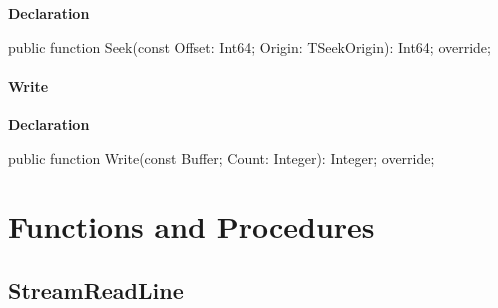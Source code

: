 \documentclass{report}
\newif\ifpdf
\begin{document}
\label{PasDoc_StreamUtils.TBufferedStream-Seek}
\begin{list}{}{
\setlength{\itemindent}{0cm}
\setlength{\listparindent}{0cm}
\setlength{\leftmargin}{\evensidemargin}
\addtolength{\leftmargin}{\tmplength}
\settowidth{\labelsep}{X}
\addtolength{\leftmargin}{\labelsep}
\setlength{\labelwidth}{\tmplength}
}
\item[\textbf{Declaration}\hfill]
\ifpdf
\begin{flushleft}
\fi
\begin{ttfamily}
public function Seek(const Offset: Int64; Origin: TSeekOrigin): Int64; override;\end{ttfamily}

\ifpdf
\end{flushleft}
\fi

\end{list}
\paragraph*{Write}\hspace*{\fill}

\label{PasDoc_StreamUtils.TBufferedStream-Write}
\begin{list}{}{
\setlength{\itemindent}{0cm}
\setlength{\listparindent}{0cm}
\setlength{\leftmargin}{\evensidemargin}
\addtolength{\leftmargin}{\tmplength}
\settowidth{\labelsep}{X}
\addtolength{\leftmargin}{\labelsep}
\setlength{\labelwidth}{\tmplength}
}
\item[\textbf{Declaration}\hfill]
\ifpdf
\begin{flushleft}
\fi
\begin{ttfamily}
public function Write(const Buffer; Count: Integer): Integer; override;\end{ttfamily}

\ifpdf
\end{flushleft}
\fi

\end{list}
\section{Functions and Procedures}
\ifpdf
\subsection*{\large{\textbf{StreamReadLine}}\normalsize\hspace{1ex}\hrulefill}
\else
\end{document}
